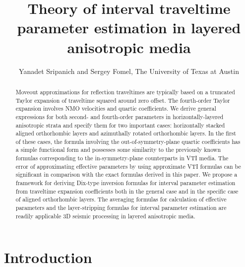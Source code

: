
\title{Theory of interval traveltime parameter estimation in layered anisotropic media}
\author{Yanadet Sripanich and Sergey Fomel, The University of Texas at Austin}

\address{
Bureau of Economic Geology \\
John A. and Katherine G. Jackson School of Geosciences \\
The University of Texas at Austin \\
University Station, Box X \\
Austin, TX 78713-8924 
}
\maketitle


\begin{abstract}
Moveout approximations for reflection traveltimes are typically based on a truncated Taylor expansion of traveltime squared around zero offset. The fourth-order Taylor expansion involves NMO velocities and quartic coefficients. We derive general expressions for  both second- and fourth-order parameters in horizontally-layered anisotropic strata and specify them for two important cases: horizontally stacked aligned orthorhombic layers and azimuthally rotated orthorhombic layers. In the first of these cases, the formula involving the out-of-symmetry-plane quartic coefficients has a simple functional form and possesses some similarity to the previously known formulas corresponding to the  in-symmetry-plane counterparts in VTI media. The error of approximating effective parameters by using approximate VTI formulas can be significant in comparison with the exact formulas derived in this paper. We propose a framework for deriving Dix-type inversion formulas for interval parameter estimation from traveltime expansion coefficients both in the general case and in the specific case of aligned orthorhombic layers. The averaging formulas for calculation of effective parameters and the layer-stripping formulas for interval parameter estimation are readily applicable  3D seismic  processing in layered anisotropic media.
\end{abstract}

\section{Introduction}

